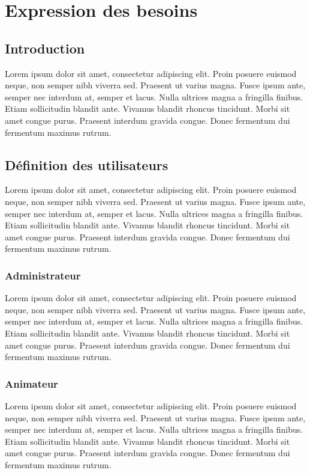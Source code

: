 \chapter{Expression des besoins}
\clearpage
\label{chap:besoins}

\section{Introduction}
Lorem ipsum dolor sit amet, consectetur adipiscing elit. Proin posuere euismod neque, non semper nibh viverra sed. Praesent ut varius magna. Fusce ipsum ante, semper nec interdum at, semper et lacus. Nulla ultrices magna a fringilla finibus. Etiam sollicitudin blandit ante. Vivamus blandit rhoncus tincidunt. Morbi sit amet congue purus. Praesent interdum gravida congue. Donec fermentum dui fermentum maximus rutrum.
\section{Définition des utilisateurs}
Lorem ipsum dolor sit amet, consectetur adipiscing elit. Proin posuere euismod neque, non semper nibh viverra sed. Praesent ut varius magna. Fusce ipsum ante, semper nec interdum at, semper et lacus. Nulla ultrices magna a fringilla finibus. Etiam sollicitudin blandit ante. Vivamus blandit rhoncus tincidunt. Morbi sit amet congue purus. Praesent interdum gravida congue. Donec fermentum dui fermentum maximus rutrum.
\subsection{Administrateur}
Lorem ipsum dolor sit amet, consectetur adipiscing elit. Proin posuere euismod neque, non semper nibh viverra sed. Praesent ut varius magna. Fusce ipsum ante, semper nec interdum at, semper et lacus. Nulla ultrices magna a fringilla finibus. Etiam sollicitudin blandit ante. Vivamus blandit rhoncus tincidunt. Morbi sit amet congue purus. Praesent interdum gravida congue. Donec fermentum dui fermentum maximus rutrum.

\subsection{Animateur}
Lorem ipsum dolor sit amet, consectetur adipiscing elit. Proin posuere euismod neque, non semper nibh viverra sed. Praesent ut varius magna. Fusce ipsum ante, semper nec interdum at, semper et lacus. Nulla ultrices magna a fringilla finibus. Etiam sollicitudin blandit ante. Vivamus blandit rhoncus tincidunt. Morbi sit amet congue purus. Praesent interdum gravida congue. Donec fermentum dui fermentum maximus rutrum.

